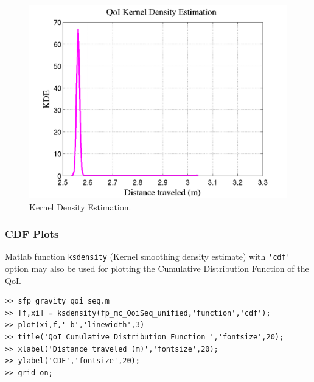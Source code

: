 \begin{figure}[htpb]
\centering 
\includegraphics[scale=0.40]{rawfigs/sfp_gravity_kde.png}
\vspace*{-10pt}
\caption{Kernel Density Estimation.}
\label{fig:sfp_gravity_kde}
\end{figure}

\subsubsection{CDF Plots}

Matlab function \verb+ksdensity+ (Kernel smoothing density estimate) with \verb+'cdf'+ option may also be used for plotting the Cumulative Distribution Function of the QoI.

\begin{lstlisting}[label=matlab:cdf_qoi,caption={Matlab code for the QoI CDF plot.}]
% inside Matlab
>> sfp_gravity_qoi_seq.m
>> [f,xi] = ksdensity(fp_mc_QoiSeq_unified,'function','cdf');
>> plot(xi,f,'-b','linewidth',3)
>> title('QoI Cumulative Distribution Function ','fontsize',20);
>> xlabel('Distance traveled (m)','fontsize',20);
>> ylabel('CDF','fontsize',20);
>> grid on;
\end{lstlisting}

